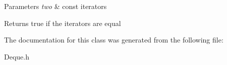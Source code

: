 \begin{DoxyParams}{Parameters}
{\em two} & const iterators \\
\hline
\end{DoxyParams}
\begin{DoxyReturn}{Returns}
true if the iterators are equal 
\end{DoxyReturn}


The documentation for this class was generated from the following file\-:\begin{DoxyCompactItemize}
\item 
Deque.\-h\end{DoxyCompactItemize}

